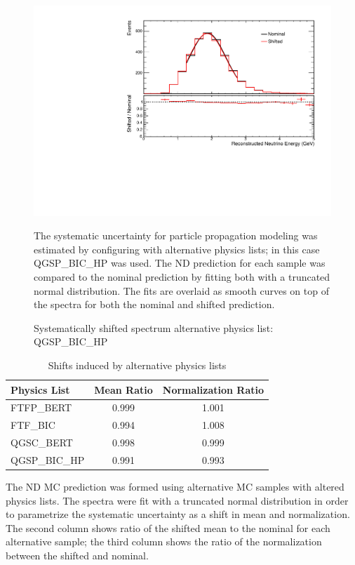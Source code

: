 {\begin{figure}
\begin{center}
\includegraphics[width=\textwidth]{figures/systs/params/nd_QGSP_BIC_HP.pdf}
\end{center}
\caption{Systematically shifted spectrum alternative \geant
physics list: QGSP\_BIC\_HP}{
The systematic uncertainty for particle propagation modeling was estimated
by configuring \geant with alternative physics lists; in this case QGSP\_BIC\_HP
was used.
The ND prediction for each sample was compared to the nominal prediction
by fitting both with a truncated normal distribution.
The fits are overlaid as smooth curves on top of the spectra for both
the nominal and shifted prediction.
}
\label{syst_param_nd_QGSP_BIC_HP}

\end{figure}



\begin{table}
\begin{center}
\begin{tabular}{|l|c|c|}
\hline
\textbf{Physics List} & \textbf{Mean Ratio} & \textbf{Normalization Ratio} \\ \hline
FTFP\_BERT  &  0.999 & 1.001\\ \hline
FTF\_BIC &  0.994 & 1.008  \\ \hline
QGSC\_BERT  &  0.998 & 0.999\\ \hline
QGSP\_BIC\_HP  &  0.991 & 0.993\\ \hline
\end{tabular}
\end{center}
\caption{Shifts induced by alternative \geant physics lists}{
The ND MC prediction was formed using alternative MC samples with altered
\geant physics lists.
The spectra were fit with a truncated normal distribution in order to
parametrize the systematic uncertainty as a shift in mean and normalization.
The second column shows ratio of the shifted mean to the nominal for each
alternative sample; the third column shows the ratio of the normalization
between the shifted and nominal.
}
\label{geant_shift_table}
\end{table}



}
